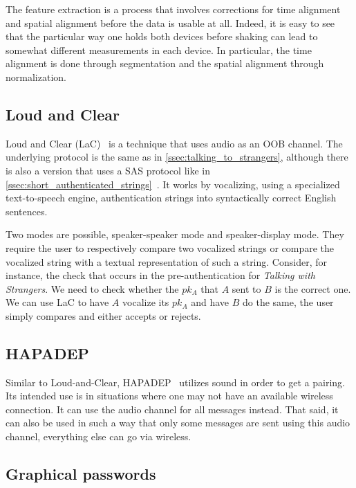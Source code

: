 \documentclass[conference, 11pt]{sty/IEEEtran}
\begin{document}
The feature extraction is a process that involves corrections for time alignment and spatial alignment before the data is usable at all.
Indeed, it is easy to see that the particular way one holds both devices before shaking can lead to somewhat different measurements in each device.
In particular, the time alignment is done through segmentation and the spatial alignment through normalization.

\subsection{Loud and Clear}
\label{ssec:loud_and_clear}

Loud and Clear (LaC)~\cite{goodrich2006loud} is a technique that uses audio as an OOB channel.
The underlying protocol is the same as in \autoref{ssec:talking_to_strangers}, although there is also a version that uses a SAS protocol like in \autoref{ssec:short_authenticated_strings}~\cite{kumar2009comparative}.
It works by vocalizing, using a specialized text-to-speech engine, authentication strings into syntactically correct English sentences.

Two modes are possible, speaker-speaker mode and speaker-display mode.
They require the user to respectively compare two vocalized strings or compare the vocalized string with a textual representation of such a string.
Consider, for instance, the check that occurs in the pre-authentication for \emph{Talking with Strangers}.
We need to check whether the $pk_A$ that $A$ sent to $B$ is the correct one.
We can use LaC to have $A$ vocalize its $pk_A$ and have $B$ do the same, the user simply compares and either accepts or rejects.

\subsection{HAPADEP}
\label{ssec:hapadep}

Similar to Loud-and-Clear, HAPADEP~\cite{soriente2008hapadep} utilizes sound in order to get a pairing.
Its intended use is in situations where one may not have an available wireless connection.
It can use the audio channel for all messages instead.
That said, it can also be used in such a way that only some messages are sent using this audio channel, everything else can go via wireless.


\subsection{Graphical passwords}
\label{ssec:graphical_passwords}
\end{document}
